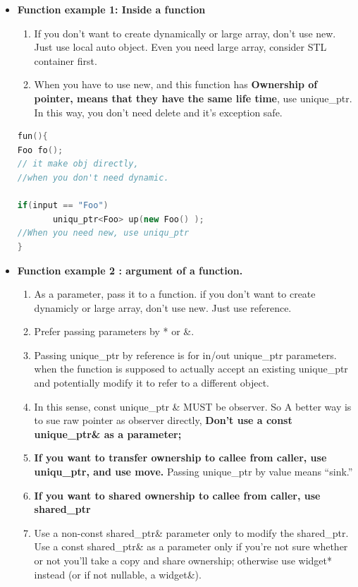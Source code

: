 \documentclass[a4paper,12pt,twoside]{book}
\begin{document}
\begin{itemize}
\item \textbf{Function example 1: Inside a function}
\begin{enumerate}
\item If you don't want to create dynamically or large array, don't use new. Just use local auto object. Even you need large array, consider STL container first.
\item When you have to use new, and this function has \textbf{Ownership of pointer, means that they have the same life time},  use unique\_ptr. In this way, you don't need delete and it's exception safe.
\end{enumerate}
\begin{lstlisting}[frame=single, language=c++]
fun(){
Foo fo();
// it make obj directly,
//when you don't need dynamic.

if(input == "Foo")
       uniqu_ptr<Foo> up(new Foo() );
//When you need new, use uniqu_ptr
}
\end{lstlisting}


\item \textbf{Function example 2 : argument of a function.}
\begin{enumerate}
\item As a parameter, pass it to a function. if you don't want to create dynamicly or large array, don't use new. Just use reference.

\item Prefer passing parameters by * or \&.

\item Passing unique\_ptr by reference is for in/out unique\_ptr parameters. when the function is supposed to actually accept an existing unique\_ptr and potentially modify it to refer to a different object. 

\item In this sense, const unique\_ptr \& MUST be observer. So A better way is to sue raw pointer as observer directly, \textbf{Don’t use a const unique\_ptr\& as a parameter; }

\item \textbf{If you want to transfer ownership to callee from caller, use uniqu\_ptr, and use move.} Passing unique\_ptr by value means “sink.”

\item \textbf{If you want to shared ownership to callee from caller, use shared\_ptr}

\item Use a non-const shared\_ptr\& parameter only to modify the shared\_ptr. Use a const shared\_ptr\& as a parameter only if you’re not sure whether or not you’ll take a copy and share ownership; otherwise use widget* instead (or if not nullable, a widget\&).


\end{enumerate}
\end{itemize}
\end{document}
